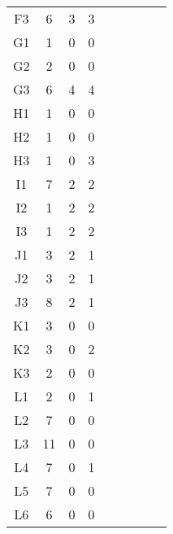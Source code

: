 \begin{center}
\begin{longtable}{ccccc|cccc}
    F3    & 6     & 3     & 3 \\
    G1    & 1     & 0     & 0 \\
    G2    & 2     & 0     & 0 \\
    G3    & 6     & 4     & 4 \\
    H1    & 1     & 0     & 0 \\
    H2    & 1     & 0     & 0 \\
    H3    & 1     & 0     & 3 \\
    I1    & 7     & 2     & 2 \\
    I2    & 1     & 2     & 2 \\
    I3    & 1     & 2     & 2 \\
    J1    & 3     & 2     & 1 \\
    J2    & 3     & 2     & 1 \\
    J3    & 8     & 2     & 1 \\
    K1    & 3     & 0     & 0 \\
    K2    & 3     & 0     & 2 \\
    K3    & 2     & 0     & 0 \\
    L1    & 2     & 0     & 1 \\
    L2    & 7     & 0     & 0 \\
    L3    & 11    & 0     & 0 \\
    L4    & 7     & 0     & 1 \\
    L5    & 7     & 0     & 0 \\
    L6    & 6     & 0     & 0 \\

\end{longtable}
\end{center}

